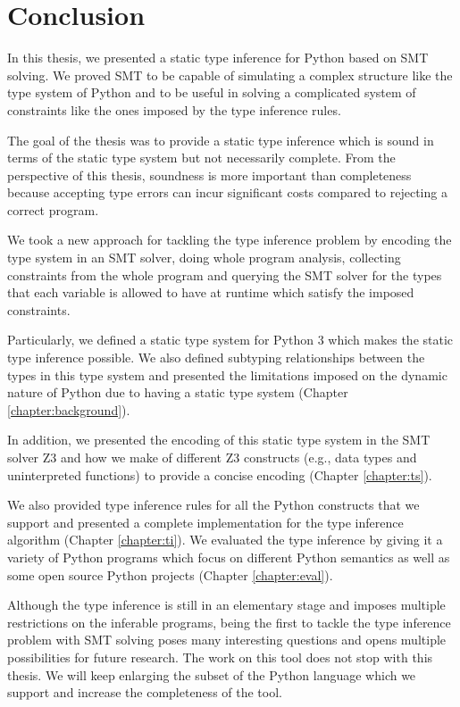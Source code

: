 
\chapter{Conclusion}\label{chapter:conc}
In this thesis, we presented a static type inference for Python based on SMT solving. We proved SMT to be capable of simulating a complex structure like the type system of Python and to be useful in solving a complicated system of constraints like the ones imposed by the type inference rules.

The goal of the thesis was to provide a static type inference which is sound in terms of the static type system but not necessarily complete. From the perspective of this thesis, soundness is more important than completeness because accepting type errors can incur significant costs compared to rejecting a correct program.

We took a new approach for tackling the type inference problem by encoding the type system in an SMT solver, doing whole program analysis, collecting constraints from the whole program and querying the SMT solver for the types that each variable is allowed to have at runtime which satisfy the imposed constraints.

Particularly, we defined a static type system for Python 3 which makes the static type inference possible. We also defined subtyping relationships between the types in this type system and presented the limitations imposed on the dynamic nature of Python due to having a static type system (Chapter \ref{chapter:background}).

In addition, we presented the encoding of this static type system in the SMT solver Z3 and how we make of different Z3 constructs (e.g., data types and uninterpreted functions) to provide a concise encoding (Chapter \ref{chapter:ts}).

We also provided type inference rules for all the Python constructs that we support and presented a complete implementation for the type inference algorithm (Chapter \ref{chapter:ti}). We evaluated the type inference by giving it a variety of Python programs which focus on different Python semantics as well as some open source Python projects (Chapter \ref{chapter:eval}).

Although the type inference is still in an elementary stage and imposes multiple restrictions on the inferable programs, being the first to tackle the type inference problem with SMT solving poses many interesting questions and opens multiple possibilities for future research. The work on this tool does not stop with this thesis. We will keep enlarging the subset of the Python language which we support and increase the completeness of the tool.